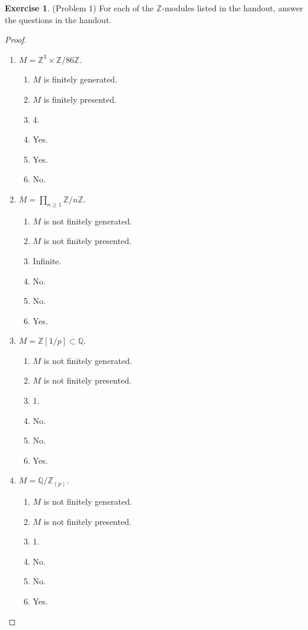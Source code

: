 \documentclass[12pt, psamsfonts]{amsart}
\theoremstyle{definition}
\newtheorem*{exer}{Exercise}
\theoremstyle{remark}
\numberwithin{equation}{section}
\begin{document}
\begin{exer}{(Problem 1)}
  For each of the $\mathbb{Z}$-modules listed in the handout, answer the questions in the handout.
\end{exer}

\begin{proof}
$ $
  \begin{enumerate}[label=(\alph*)]
    \item 
      $M = \mathbb{Z}^3 \times \mathbb{Z} / 86\mathbb{Z}$.
      \begin{enumerate}[label=(\roman*)]
        \item 
          $M$ is finitely generated.
        \item
          $M$ is finitely presented.
        \item
          4.
        \item
          Yes.
        \item
          Yes.
        \item
          No.
      \end{enumerate}
    \item 
      $M = \prod_{n \geq 1} \mathbb{Z} / n\mathbb{Z}$.
      \begin{enumerate}[label=(\roman*)]
        \item 
          $M$ is not finitely generated.
        \item
          $M$ is not finitely presented.
        \item
          Infinite.
        \item
          No.
        \item
          No.
        \item
          Yes.
      \end{enumerate}
    \item 
      $M = \mathbb{Z}[1/p] \subset \mathbb{Q}$.
      \begin{enumerate}[label=(\roman*)]
        \item 
          $M$ is not finitely generated.
        \item
          $M$ is not finitely presented.
        \item
          1.
        \item
          No.
        \item
          No.
        \item
          Yes.
      \end{enumerate}
    \item 
      $M = \mathbb{Q} / \mathbb{Z}_{(p)}$.
      \begin{enumerate}[label=(\roman*)]
        \item 
          $M$ is not finitely generated.
        \item
          $M$ is not finitely presented.
        \item
          1.
        \item
          No.
        \item
          No.
        \item
          Yes.
      \end{enumerate}
  \end{enumerate}
\end{proof}
\end{document}
